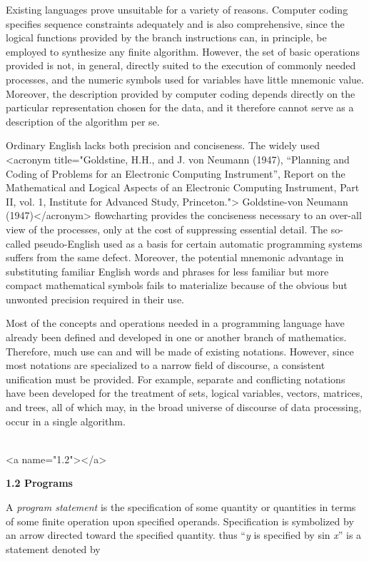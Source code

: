 \par Existing languages prove unsuitable for a variety of reasons. Computer coding specifies sequence constraints adequately and is also comprehensive, since the logical functions provided by the branch instructions can, in principle, be employed to synthesize any finite algorithm. However, the set of basic operations provided is not, in general, directly suited to the execution of commonly needed processes, and the numeric symbols used for variables have little mnemonic value. Moreover, the description provided by computer coding depends directly on the particular representation chosen for the data, and it therefore cannot serve as a description of the algorithm per se.

\par Ordinary English lacks both precision and conciseness. The widely used 
<acronym title="Goldstine, H.H., and J. von Neumann (1947), “Planning and Coding of Problems for an Electronic Computing Instrument”, Report on the Mathematical and Logical Aspects of an Electronic Computing Instrument, Part II, vol. 1, Institute for Advanced Study, Princeton."> Goldstine-von Neumann (1947)</acronym> flowcharting provides the conciseness necessary to an over-all view of the processes, only at the cost of suppressing essential detail. The so-called pseudo-English used as a basis for certain automatic programming systems suffers from the same defect. Moreover, the potential mnemonic advantage in substituting familiar English words and phrases for less familiar but more compact mathematical symbols fails to materialize because of the obvious but unwonted precision required in their use.

\par Most of the concepts and operations needed in a programming language have already been defined and developed in one or another branch of mathematics. Therefore, much use can and will be made of existing notations. However, since most notations are specialized to a narrow field of discourse, a consistent unification must be provided. For example, separate and conflicting notations have been developed for the treatment of sets, logical variables, vectors, matrices, and trees, all of which may, in the broad universe of discourse of data processing, occur in a single algorithm.
\\\ 


<a name="1.2"></a>
\par \textbf{1.2 Programs}

\par A \textit{program statement} is the specification of some quantity or quantities in terms of some finite operation upon specified operands. Specification is symbolized by an arrow directed toward the specified quantity. thus ``\textit{y} is specified by sin \textit{x}'' is a statement denoted by

